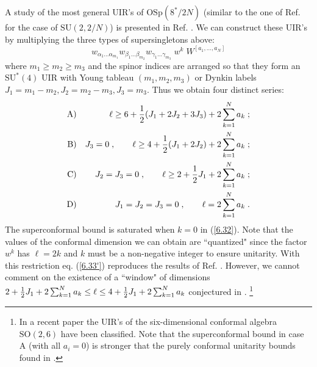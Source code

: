 \documentclass[a4paper,12pt]{article}
\begin{document}
A study of the most general UIR's of $\mbox{OSp}(8^*/2N)$ 
(similar to the one of Ref. \cite{dp} for the case of 
$\mbox{SU}(2,2/N)$) is presented in Ref. \cite{Minw2}. We can 
construct these UIR's by multiplying the three types of 
supersingletons above:
\begin{equation}\label{6.32}
  w_{\alpha_1\ldots\alpha_{m_1}}w_{\beta_1\ldots\beta_{m_2}}
w_{\gamma_1\ldots\gamma_{m_3}}\; w^k\; W^{[a_1,\ldots,a_N]}
\end{equation}
where $m_1\geq m_2 \geq m_3$ and the spinor indices are arranged 
so that they form an $\mbox{SU}^*(4)$ UIR with Young tableau 
$(m_1,m_2,m_3)$ or Dynkin labels 
$J_1=m_1-m_2,J_2=m_2-m_3,J_3=m_3$. Thus we obtain four distinct 
series:
\begin{eqnarray}
  \mbox{A)}&& \ell
\geq 6 +{1\over 2}(J_1+2J_2+3J_3)+2\sum_{k=1}^N a_k\;; \nonumber\\
  \mbox{B)}&& J_3=0\;,  \qquad \ell
\geq 4 +{1\over 2}(J_1+2J_2)+2\sum_{k=1}^N a_k\;; \nonumber\\
  \mbox{C)}&& J_2=J_3=0\;, \qquad \ell
\geq 2 +{1\over 2}J_1+2\sum_{k=1}^N a_k\;; \nonumber\\
  \mbox{D)}&& J_1=J_2=J_3= 0\;, \qquad \ell
= 2\sum_{k=1}^N a_k\;. \label{6.33'}
\end{eqnarray}
The superconformal bound is saturated when $k=0$ in (\ref{6.32}). 
Note that the values of the conformal dimension we can obtain are 
``quantized" since the factor $w^k$ has $\ell=2k$ and $k$ must be 
a non-negative integer to ensure unitarity. With this restriction 
eq. (\ref{6.33'}) reproduces the results of Ref. \cite{Minw2}. 
However, we cannot comment on the existence of a ``window" of 
dimensions $2 +{1\over 2}J_1+2\sum_{k=1}^N a_k\leq \ell \leq 4 
+{1\over 2}J_1+2\sum_{k=1}^N a_k$ conjectured in \cite{Minw2}. 
\footnote{In a recent paper \cite{FFr} the UIR's of the 
six-dimensional conformal algebra $\mbox{SO}(2,6)$ have been 
classified. Note that the superconformal bound in case A (with 
all $a_i=0$) is stronger that the purely conformal unitarity 
bounds found in \cite{FFr}.}
\end{document}
